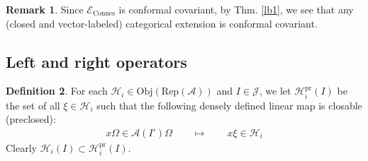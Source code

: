 \documentclass[11pt,b5paper,notitlepage]{article}
\theoremstyle{definition}
\newtheorem{df}{Definition}[section]
\newtheorem{rem}[df]{Remark}
\theoremstyle{plain}
\newcommand{\mc}{\mathcal}
\newcommand{\Rep}{\mathrm{Rep}}
\newcommand{\scr}{\mathscr}
\newcommand{\pr}{\mathrm {pr}}
\newcommand{\Obj}{\mathrm{Obj}}
\newcommand{\Connes}{\mathrm{Connes}}
\numberwithin{equation}{section}
\begin{document}
\begin{rem}\label{lb20}
Since $\scr E_\Connes$ is conformal covariant, by Thm. \ref{lb1}, we see that any (closed and vector-labeled) categorical extension is conformal covariant.
\end{rem}


\subsection{Left and right operators}\label{lb22}


\begin{df}\label{lb29}
For each $\mc H_i\in\Obj(\Rep(\mc A))$ and $I\in\mc J$, we let $\mc H_i^\pr(I)$ be the set of all $\xi\in\mc H_i$ such that the following densely defined linear map is closable (preclosed):
\begin{align}
x\Omega\in\mc A(I')\Omega\qquad\mapsto\qquad x\xi\in\mc H_i
\end{align}
Clearly $\mc H_i(I)\subset\mc H_i^\pr(I)$.
\end{df}
\end{document}
